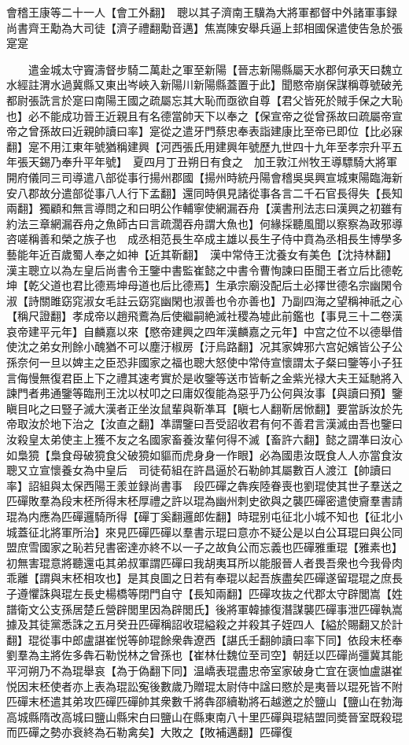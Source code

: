 會稽王康等二十一人【會工外翻】　聰以其子濟南王驥為大將軍都督中外諸軍事録尚書齊王勱為大司徒【濟子禮翻勱音邁】焦嵩陳安舉兵逼上邽相國保遣使告急於張寔寔

　　遣金城太守竇濤督步騎二萬赴之軍至新陽【晉志新陽縣屬天水郡何承天曰魏立水經註渭水過冀縣又東出岑峽入新陽川新陽縣蓋置于此】聞愍帝崩保謀稱尊號破羌都尉張詵言於寔曰南陽王國之疏屬忘其大恥而亟欲自尊【君父皆死於賊手保之大恥也】必不能成功晉王近親且有名德當帥天下以奉之【保宣帝之從曾孫故曰疏屬帝宣帝之曾孫故曰近親帥讀曰率】寔從之遣牙門蔡忠奉表詣建康比至帝已即位【比必寐翻】寔不用江東年號猶稱建興【河西張氏用建興年號歷九世四十九年至孝宗升平五年張天錫乃奉升平年號】　夏四月丁丑朔日有食之　加王敦江州牧王導驃騎大將軍開府儀同三司導遣八部從事行揚州郡國【揚州時統丹陽會稽吳吳興宣城東陽臨海新安八郡故分遣部從事八人行下孟翻】還同時俱見諸從事各言二千石官長得失【長知兩翻】獨顧和無言導問之和曰明公作輔寧使網漏吞舟【漢書刑法志曰漢興之初雖有約法三章網漏吞舟之魚師古曰言疏濶吞舟謂大魚也】何緣採聽風聞以察察為政邪導咨嗟稱善和榮之族子也　成丞相范長生卒成主雄以長生子侍中賁為丞相長生博學多藝能年近百歲蜀人奉之如神【近其靳翻】　漢中常侍王沈養女有美色【沈持林翻】漢主聰立以為左皇后尚書令王鑒中書監崔懿之中書令曹恂諫曰臣聞王者立后比德乾坤【乾父道也君比德焉坤母道也后比德焉】生承宗廟没配后土必擇世德名宗幽閑令淑【詩關雎窈窕淑女毛註云窈窕幽閑也淑善也令亦善也】乃副四海之望稱神祇之心【稱尺證翻】孝成帝以趙飛鷰為后使繼嗣絶滅社稷為墟此前鑑也【事見三十二卷漢哀帝建平元年】自麟嘉以來【愍帝建興之四年漢麟嘉之元年】中宫之位不以德舉借使沈之弟女刑餘小醜猶不可以塵汙椒房【汙烏路翻】况其家婢邪六宫妃嬪皆公子公孫奈何一旦以婢主之臣恐非國家之福也聰大怒使中常侍宣懷謂太子粲曰鑒等小子狂言侮慢無復君臣上下之禮其速考實於是收鑒等送市皆斬之金紫光禄大夫王延馳將入諫門者弗通鑒等臨刑王沈以杖叩之曰庸奴復能為惡乎乃公何與汝事【與讀曰預】鑒瞋目叱之曰豎子滅大漢者正坐汝鼠輩與靳凖耳【瞋七人翻靳居惞翻】要當訴汝於先帝取汝於地下治之【汝直之翻】凖謂鑒曰吾受詔收君有何不善君言漢滅由吾也鑒曰汝殺皇太弟使主上獲不友之名國家畜養汝輩何得不滅【畜許六翻】懿之謂凖曰汝心如梟獍【梟食母破獍食父破獍如貙而虎身身一作眼】必為國患汝既食人人亦當食汝聰又立宣懷養女為中皇后　司徒荀組在許昌逼於石勒帥其屬數百人渡江【帥讀曰率】詔組與太保西陽王羕並録尚書事　段匹磾之犇疾陸眷喪也劉琨使其世子羣送之匹磾敗羣為段末柸所得末柸厚禮之許以琨為幽州刺史欲與之襲匹磾密遣使齎羣書請琨為内應為匹磾邏騎所得【磾丁奚翻邏郎佐翻】時琨别屯征北小城不知也【征北小城蓋征北將軍所治】來見匹磾匹磾以羣書示琨曰意亦不疑公是以白公耳琨曰與公同盟庶雪國家之恥若兒書密達亦終不以一子之故負公而忘義也匹磾雅重琨【雅素也】初無害琨意將聽還屯其弟叔軍謂匹磾曰我胡夷耳所以能服晉人者畏吾衆也今我骨肉乖離【謂與末柸相攻也】是其良圖之日若有奉琨以起吾族盡矣匹磾遂留琨琨之庶長子遵懼誅與琨左長史楊橋等閉門自守【長知兩翻】匹磾攻抜之代郡太守辟閭嵩【姓譜衛文公支孫居楚丘營辟閭里因為辟閭氏】後將軍韓據復潛謀襲匹磾事泄匹磾執嵩據及其徒黨悉誅之五月癸丑匹磾稱詔收琨縊殺之并殺其子姪四人【縊於賜翻又於計翻】琨從事中郎盧諶崔悦等帥琨餘衆犇遼西【諶氏壬翻帥讀曰率下同】依段末柸奉劉羣為主將佐多犇石勒悦林之曾孫也【崔林仕魏位至司空】朝廷以匹磾尚彊冀其能平河朔乃不為琨舉哀【為于偽翻下同】温嶠表琨盡忠帝室家破身亡宜在褒恤盧諶崔悦因末柸使者亦上表為琨訟寃後數歲乃贈琨太尉侍中諡曰愍於是夷晉以琨死皆不附匹磾末柸遣其弟攻匹磾匹磾帥其衆數千將犇邵續勒將石越邀之於鹽山【鹽山在勃海高城縣隋改高城曰鹽山縣宋白曰鹽山在縣東南八十里匹磾與琨結盟同奬晉室既殺琨而匹磾之勢亦衰終為石勒禽矣】大敗之【敗補邁翻】匹磾復